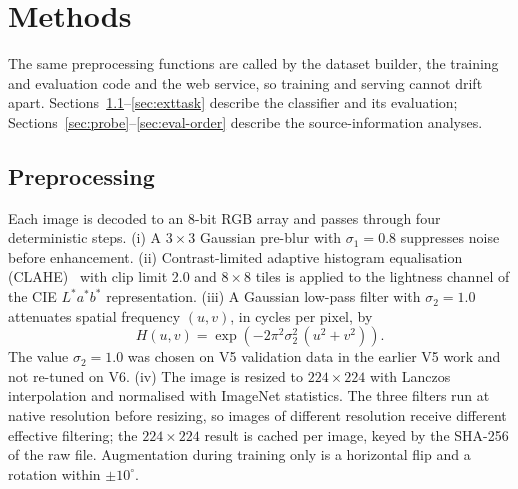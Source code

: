 \section{Methods}
\label{sec:methods}

The same preprocessing functions are called by the dataset builder, the training and evaluation code and the web service, so training and serving cannot drift apart. Sections~\ref{sec:preproc}--\ref{sec:exttask} describe the classifier and its evaluation; Sections~\ref{sec:probe}--\ref{sec:eval-order} describe the source-information analyses.

\subsection{Preprocessing}
\label{sec:preproc}
Each image is decoded to an 8-bit RGB array and passes through four deterministic steps. (i) A $3\times3$ Gaussian pre-blur with $\sigma_1=0.8$ suppresses noise before enhancement. (ii) Contrast-limited adaptive histogram equalisation (CLAHE)~\cite{pizer1987adaptive,zuiderveld1994contrast} with clip limit 2.0 and $8\times8$ tiles is applied to the lightness channel of the CIE $L^*a^*b^*$ representation. (iii) A Gaussian low-pass filter with $\sigma_2=1.0$ attenuates spatial frequency $(u,v)$, in cycles per pixel, by
\begin{equation}
H(u,v)=\exp\!\left(-2\pi^2\sigma_2^2\,(u^2+v^2)\right).
\label{eq:lowpass}
\end{equation}
The value $\sigma_2=1.0$ was chosen on V5 validation data in the earlier V5 work and not re-tuned on V6. (iv) The image is resized to $224\times224$ with Lanczos interpolation and normalised with ImageNet statistics. The three filters run at native resolution before resizing, so images of different resolution receive different effective filtering; the $224\times224$ result is cached per image, keyed by the SHA-256 of the raw file. Augmentation during training only is a horizontal flip and a rotation within $\pm10^\circ$.

